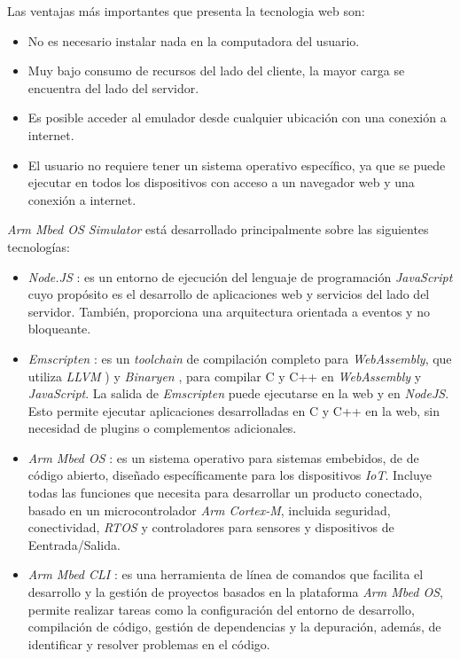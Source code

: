 \hfill \break
\hfill \break
\hfill \break

Las ventajas más importantes que presenta la tecnologia web son:

\begin{itemize}
	\item No es necesario instalar nada en la computadora del usuario.
	\item Muy bajo consumo de recursos del lado del cliente, la mayor carga se encuentra del lado del servidor.
	\item Es posible acceder al emulador desde cualquier ubicación con una conexión a internet.
	\item El usuario no requiere tener un sistema operativo específico, ya que se puede ejecutar en todos los dispositivos con acceso a un navegador web y una conexión a internet.
\end{itemize}

\textit{Arm Mbed OS Simulator} está desarrollado principalmente sobre las siguientes tecnologías:

\begin{itemize}

    \item \textit{Node.JS} \citep{NodeJS}: es un entorno de ejecución del lenguaje de programación \textit{JavaScript} \citep{JavaScript} cuyo propósito es el desarrollo de aplicaciones web y servicios del lado del servidor. También, proporciona una arquitectura orientada a eventos y no bloqueante. 
 
    \item \textit{Emscripten} \citep{Emscripten}: es un \textit{toolchain} de compilación completo para \textit{WebAssembly}, que utiliza \textit{LLVM} \citep{LLVM}) y \textit{Binaryen} \citep{Binaryen}, para compilar C y C++ en \textit{WebAssembly} \citep{WebAssembly} y \textit{JavaScript}. La salida de \textit{Emscripten} puede ejecutarse en la web y en \textit{NodeJS}. Esto permite ejecutar aplicaciones desarrolladas en C y C++ en la web, sin necesidad de plugins o complementos adicionales.

    \item \textit{Arm Mbed OS} \citep{MbedOS}: es un sistema operativo para sistemas embebidos, de de código abierto, diseñado específicamente para los dispositivos \textit{IoT}. Incluye todas las funciones que necesita para desarrollar un producto conectado, basado en un microcontrolador \textit{Arm Cortex-M}, incluida seguridad, conectividad, \textit{RTOS} y controladores para sensores y dispositivos de Eentrada/Salida.
    
    \item \textit{Arm Mbed CLI} \citep{MbedCLI}: es una herramienta de línea de comandos que facilita el desarrollo y la gestión de proyectos basados en la plataforma \textit{Arm Mbed OS}, permite realizar tareas como la configuración del entorno de desarrollo, compilación de código, gestión de dependencias y la depuración, además, de identificar y resolver problemas en el código.

\end{itemize}

